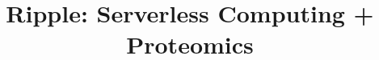 \documentclass[10pt, twocolumn]{article}
\title{Ripple: Serverless Computing + Proteomics}
\date{}
\begin{document}
\maketitle

\begin{sloppypar}

%

%


%
%
%
%

%
%
%
\vspace{-0.15in}
\end{sloppypar}


\clearpage %
{


}
\end{document}
